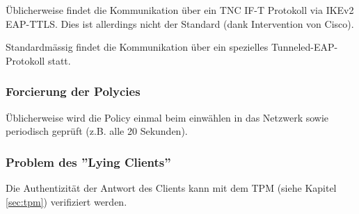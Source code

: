 Üblicherweise findet die Kommunikation über ein TNC IF-T Protokoll via IKEv2 EAP-TTLS. Dies ist allerdings nicht der Standard (dank Intervention von Cisco).

Standardmässig findet die Kommunikation über ein spezielles Tunneled-EAP-Protokoll statt.

\subsubsection{Forcierung der Polycies}

Üblicherweise wird die Policy einmal beim einwählen in das Netzwerk sowie periodisch geprüft (z.B. alle 20 Sekunden). 

\subsubsection{Problem des ''Lying Clients''}
Die Authentizität der Antwort des Clients kann mit dem TPM (siehe Kapitel \ref{sec:tpm}) verifiziert werden.

